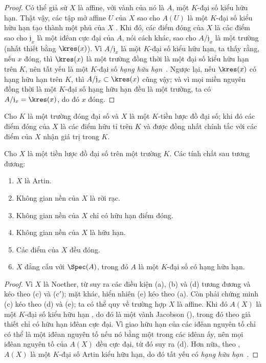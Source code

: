 \documentclass[oneside]{amsart}
\newcommand{\oldpage}[2][]{{\marginnote{\normalfont\textbf{#1}~|~#2}}\ignorespaces}
\let\EGAOriginalLabel\label
\renewcommand{\label}[1]{\phantomsection\EGAOriginalLabel{#1}}
\begin{document}
\begin{proof}
Có thể giả sử $X$ là affine, với vành của nó là $A$, một $K$-đại số
kiểu hữu hạn.
Thật vậy, các tập mở affine $U$ của $X$ sao cho $A(U)$ là một
$K$-đại số kiểu hữu hạn tạo thành một phủ của $X$
.
Khi đó, các điểm đóng của $X$ là các điểm sao cho $\mathfrak{j}_x$ là
\oldpage[I]{148}
một iđêan cực đại của $A$, nói cách khác, sao cho $A/\mathfrak{j}_x$ là
một trường (nhất thiết bằng $\kres(x)$).
Vì $A/\mathfrak{j}_x$ là một $K$-đại số kiểu hữu hạn, ta thấy rằng, nếu
$x$ đóng, thì $\kres(x)$ là một trường đồng thời là một đại số kiểu hữu
hạn trên $K$, nên tất yếu là một $K$-đại số \emph{hạng hữu
hạn}~\cite{I-21}.
Ngược lại, nếu $\kres(x)$ có hạng hữu hạn trên $K$, thì
$A/\mathfrak{j}_x\subset\kres(x)$ cũng vậy; và vì mọi miền nguyên đồng thời là
một $K$-đại số hạng hữu hạn đều là một trường, ta có
$A/\mathfrak{j}_x=\kres(x)$, do đó $x$ đóng.
\end{proof}

\begin{corollary}[6.4.3]
\label{I.6.4.3}
Cho $K$ là một trường đóng đại số và $X$ là một $K$-tiền lược đồ đại số;
khi đó các điểm đóng của $X$ là các điểm hữu tỉ trên $K$
 và được đồng nhất chính tắc với các điểm của $X$ nhận giá trị
trong $K$.
\end{corollary}

\begin{proposition}[6.4.4]
\label{I.6.4.4}
Cho $X$ là một tiền lược đồ đại số trên một trường $K$.
Các tính chất sau tương đương:
\begin{enumerate}
  \item[{\rm(a)}] $X$ là Artin.
  \item[{\rm(b)}] Không gian nền của $X$ là rời rạc.
  \item[{\rm(c)}] Không gian nền của $X$ chỉ có hữu hạn điểm đóng.
  \item[{\rm(c')}] Không gian nền của $X$ là hữu hạn.
  \item[{\rm(d)}] Các điểm của $X$ đều đóng.
  \item[{\rm(e)}] $X$ đẳng cấu với $\Spec(A)$, trong đó $A$ là một $K$-đại số có hạng hữu hạn.
\end{enumerate}
\end{proposition}

\begin{proof}
Vì $X$ là Noether, từ  suy ra các điều kiện (a), (b) và (d) tương đương và kéo theo (c) và (c$'$);
mặt khác, hiển nhiên (e) kéo theo (a).
Còn phải chứng minh (c) kéo theo (d) và (e);
ta có thể quy về trường hợp $X$ là affine.
Khi đó $A(X)$ là một $K$-đại số kiểu hữu hạn , do đó là một vành Jacobson (\cite[p.~3-11 và 3-12]{I-1}), trong đó theo giả thiết chỉ có hữu hạn iđêan cực đại.
Vì giao hữu hạn của các iđêan nguyên tố chỉ có thể là một iđêan nguyên tố nếu nó bằng một trong các iđêan ấy, nên mọi iđêan nguyên tố của $A(X)$ đều cực đại, từ đó suy ra (d).
Hơn nữa, theo , $A(X)$ là một $K$-đại số Artin kiểu hữu hạn, do đó tất yếu có \emph{hạng hữu hạn}~\cite{I-21}.
\end{proof}
\end{document}
